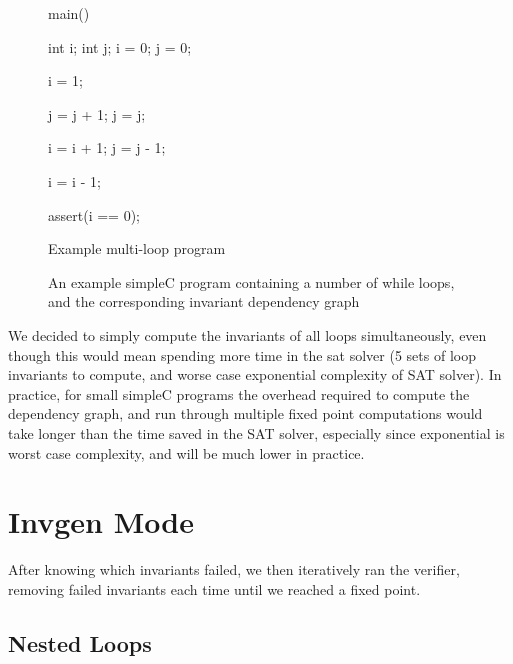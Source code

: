 \documentclass[11pt]{article}
\begin{document}
\begin{figure}[H]
\begin{center}
  \begin{minipage}[b]{.4\textwidth}
    \begin{algorithm}[H]
    main() {

    int i;
    int j;
    i = 0;
    j = 0;

     {
        i = 1;
    }

    {
       {
            j = j + 1;
        }
        j = j;

         {
            i = i + 1;
            j = j - 1;
        }
    }

     {
        i = i - 1;
    }

    assert(i == 0);
    }
    \caption{Example multi-loop program}
    \end{algorithm}
  \end{minipage}
  \quad \quad \quad \quad \quad \quad \quad \quad
  \begin{minipage}[H]{.3\textwidth}
    
  \end{minipage}
\end{center}
\caption{An example simpleC program containing a number of while loops, and the corresponding invariant dependency graph}
\end{figure}

We decided to simply compute the invariants of all loops simultaneously, even though this would mean spending more
time in the sat solver (5 sets of loop invariants to compute, and worse case exponential complexity of SAT solver).
In practice, for small simpleC programs the overhead required to compute the dependency graph, and run through multiple
fixed point computations would take longer than the time saved in the SAT solver, especially since exponential is worst
case complexity, and will be much lower in practice.

\section{Invgen Mode}
After knowing which invariants failed, we then iteratively ran the verifier, removing failed invariants each time
until we reached a fixed point.

\subsection{Nested Loops}
\end{document}
